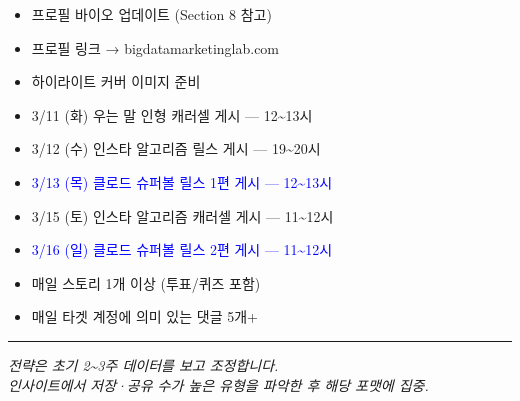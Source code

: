 \documentclass[11pt, a4paper]{article}
\begin{document}
\begin{tcolorbox}[title={Week 1 (3/10\textasciitilde 3/16) 체크리스트}]
\begin{itemize}[leftmargin=1.5em, label=$\square$]
  \item 프로필 바이오 업데이트 (Section 8 참고)
  \item 프로필 링크 → bigdatamarketinglab.com
  \item 하이라이트 커버 이미지 준비
  \item 3/11 (화) 우는 말 인형 캐러셀 게시 — 12\textasciitilde 13시
  \item 3/12 (수) 인스타 알고리즘 릴스 게시 — 19\textasciitilde 20시
  \item \textcolor{blue}{3/13 (목) 클로드 슈퍼볼 릴스 1편 게시 — 12\textasciitilde 13시}
  \item 3/15 (토) 인스타 알고리즘 캐러셀 게시 — 11\textasciitilde 12시
  \item \textcolor{blue}{3/16 (일) 클로드 슈퍼볼 릴스 2편 게시 — 11\textasciitilde 12시}
  \item 매일 스토리 1개 이상 (투표/퀴즈 포함)
  \item 매일 타겟 계정에 의미 있는 댓글 5개+
\end{itemize}
\end{tcolorbox}

\vspace{2em}

\begin{center}
\textcolor{muted}{\rule{0.5\textwidth}{0.4pt}}

\vspace{1em}

\textit{\textcolor{muted}{전략은 초기 2\textasciitilde 3주 데이터를 보고 조정합니다.}} \\
\textit{\textcolor{muted}{인사이트에서 저장·공유 수가 높은 유형을 파악한 후 해당 포맷에 집중.}}
\end{center}
\end{document}
